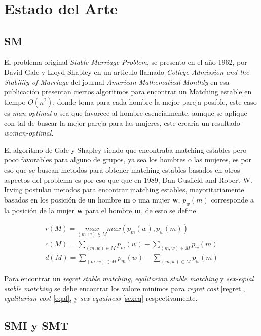 \documentclass[letter, 10pt]{article}
\begin{document}
\section{Estado del Arte} 

\subsection{SM}
El problema original \textit{Stable Marriage Problem}, se presento en el a\~no 1962, por David Gale y Lloyd Shapley en un 
articulo llamado \textit{College Admission and the Stability of Marriage} del journal \textit{American Mathematical Monthly} 
\cite{GaleShapley62} en esa publicaci\'on presentan ciertos algoritmos para encontrar un Matching estable en tiempo
$O(n^2)$, donde toma para cada hombre la mejor pareja posible, este caso es \textit{man-optimal} o sea que favorece al 
hombre esencialmente, aunque se aplique con tal de buscar la mejor pareja para las mujeres, este crearia un resultado 
\textit{woman-optimal}.

El algoritmo de Gale y Shapley siendo que encontraba matching estables pero poco favorables para alguno de grupos, ya sea los
hombres o las mujeres, es por eso que se buscan metodos para obtener matching estables basados en otros aspectos del problema
es por eso que que en 1989, Dan Gusfield and Robert W. Irving postulan metodos para encontrar matching estables\cite{Gusfield89},
mayoritariamente basados en los posici\'on de un hombre \textbf{m} o una mujer \textbf{w}, $p_w(m)$ corresponde a la posici\'on de
la mujer \textbf{w} para el hombre \textbf{m}, de esto se define

\begin{align}
r(M) = \underset{(m,w)\in M}{max} max (p_m(w),p_w(m)) \label{regret} \\
c(M) = \underset{(m,w) \in M}{\sum} p_m(w) + \underset{(m,w) \in M}{\sum} p_w(m) \label{eqal} \\
d(M) = \underset{(m,w) \in M}{\sum} p_m(w) - \underset{(m,w) \in M}{\sum} p_w(m) \label{sexeq}
\end{align}

Para encontrar un \textit{regret stable matching}, \textit{eqalitarian stable matching} y \textit{sex-equal stable matching} se debe encontrar 
los valore minimos para \textit{regret cost} \eqref{regret}, \textit{egalitarian cost} \eqref{eqal}, y \textit{sex-equalness} \eqref{sexeq} 
respectivamente.\cite{Gusfield89}

\subsection{SMI y SMT}
\end{document}
